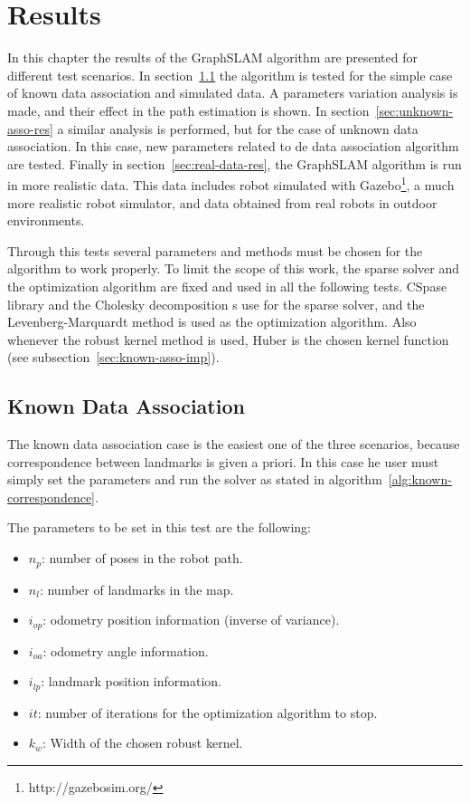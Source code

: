 \chapter{Results}
\label{chap:results}

In this chapter the results of the GraphSLAM algorithm are presented for different test scenarios. In section~\ref{sec:known-asso-res} the algorithm is tested for the simple case of known data association and simulated data. A parameters variation analysis is made, and their effect in the path estimation is shown. In section~\ref{sec:unknown-asso-res} a similar analysis is performed, but for the case of unknown data association. In this case, new parameters related to de data association algorithm are tested. Finally in section~\ref{sec:real-data-res}, the GraphSLAM algorithm is run in more realistic data. This data includes robot simulated with Gazebo\footnote{http://gazebosim.org/}, a much more realistic robot simulator, and data obtained from real robots in outdoor environments. 

Through this tests several parameters and methods must be chosen for the algorithm to work properly. To limit the scope of this work, the sparse solver and the optimization algorithm are fixed and used in all the following tests. CSpase library and the Cholesky decomposition s use for the sparse solver, and the Levenberg-Marquardt method is used as the optimization algorithm. Also whenever the robust kernel method is used, Huber is the chosen kernel function (see subsection~\ref{sec:known-asso-imp}). 

\section{Known Data Association}
\label{sec:known-asso-res}

The known data association case is the easiest one of the three scenarios, because correspondence between landmarks is given a priori. In this case he user must simply set the parameters and run the solver as stated in algorithm~\ref{alg:known-correspondence}. 

The parameters to be set in this test are the following:

\begin{itemize}
    \item $n_p$: number of poses in the robot path.
    \item $n_l$: number of landmarks in the map.
    \item $i_{op}$: odometry position information (inverse of variance).
    \item $i_{oa}$: odometry angle information.
    \item $i_{lp}$: landmark position information.
    \item $it$: number of iterations for the optimization algorithm to stop.
    \item $k_w$: Width of the chosen robust kernel.
\end{itemize}

